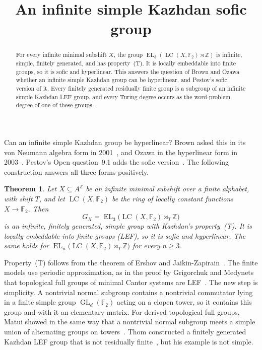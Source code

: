 \documentclass[11pt]{amsart}
\newtheorem{theorem}{Theorem}
\newcommand{\F}{\mathbb F}
\newcommand{\Z}{\mathbb Z}
\newcommand{\LC}{\operatorname{LC}}
\newcommand{\EL}{\operatorname{EL}}
\newcommand{\GL}{\operatorname{GL}}
\begin{document}
\title{An infinite simple Kazhdan sofic group}
\author{\paperauthorname}
\date{}

\begin{abstract}
For every infinite minimal subshift $X$, the group
$\EL_3(\LC(X,\F_2)\rtimes\Z)$ is infinite, simple, finitely generated,
and has property~\textup{(T)}. It is locally embeddable into finite
groups, so it is sofic and hyperlinear. This answers the question of
Brown and Ozawa whether an infinite simple Kazhdan group can be
hyperlinear, and Pestov's sofic version of it. Every finitely generated
residually finite group is a subgroup of an infinite simple Kazhdan LEF
group, and every Turing degree occurs as the word-problem degree of one
of these groups.
\end{abstract}
\maketitle

Can an infinite simple Kazhdan group be hyperlinear? Brown asked this
in its von Neumann algebra form in 2001~\cite[\S11, Question~7]{Brown},
and Ozawa in the hyperlinear form in 2003~\cite[p.~527]{Ozawa}.
Pestov's Open question~9.1 adds the sofic version~\cite{Pestov}.
The following construction answers all three forms positively.

\begin{theorem}\label{thm:main}
Let $X\subseteq A^{\Z}$ be an infinite minimal subshift over a finite
alphabet, with shift $T$, and let $\LC(X,\F_2)$ be the ring of locally
constant functions $X\to\F_2$. Then
\[
  G_X=\EL_3\bigl(\LC(X,\F_2)\rtimes_T\Z\bigr)
\]
is an infinite, finitely generated, simple group with Kazhdan's
property~\textup{(T)}. It is locally embeddable into finite groups
\textup{(LEF)}, so it is sofic and hyperlinear. The same holds for
$\EL_n\bigl(\LC(X,\F_2)\rtimes_T\Z\bigr)$ for every $n\ge3$.
\end{theorem}

Property~\textup{(T)} follows from the theorem of Ershov and
Jaikin-Zapirain~\cite{EJZ}. The finite models use periodic approximation,
as in the proof by Grigorchuk and Medynets that topological full groups
of minimal Cantor systems are LEF~\cite[Theorem~2.6]{GM}. The new step is
simplicity. A nontrivial normal subgroup contains a nontrivial commutator
lying in a finite simple group $\GL_d(\F_2)$ acting on a clopen tower, so
it contains this group and with it an elementary matrix. For derived
topological full groups, Matui showed in the same way that a nontrivial
normal subgroup meets a simple union of alternating groups on
towers~\cite[Lemma~3.4 and Theorem~4.9]{Matui}. Thom constructed a
finitely generated Kazhdan LEF group that is not residually
finite~\cite{Thom}, but his example is not simple.
\end{document}
